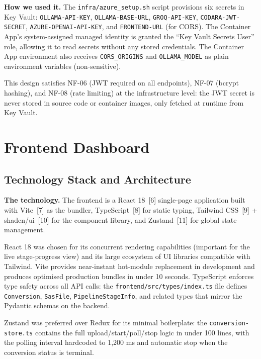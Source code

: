 \textbf{How we used it.} The \texttt{infra/azure\_setup.sh} script provisions
six secrets in Key Vault:
\texttt{OLLAMA-API-KEY}, \texttt{OLLAMA-BASE-URL},
\texttt{GROQ-API-KEY}, \texttt{CODARA-JWT-SECRET},
\texttt{AZURE-OPENAI-API-KEY}, and \texttt{FRONTEND-URL} (for CORS).
The Container App's system-assigned managed identity is granted the
``Key Vault Secrets User'' role, allowing it to read secrets without any stored
credentials. The Container App environment also receives \texttt{CORS\_ORIGINS}
and \texttt{OLLAMA\_MODEL} as plain environment variables (non-sensitive).

This design satisfies NF-06 (JWT required on all endpoints), NF-07 (bcrypt
hashing), and NF-08 (rate limiting) at the infrastructure level: the JWT secret
is never stored in source code or container images, only fetched at runtime from
Key Vault.

\section{Frontend Dashboard}
\label{sec:frontend-deployment}

\subsection{Technology Stack and Architecture}
\label{subsec:frontend-stack}

\textbf{The technology.} The frontend is a React 18~[6] single-page application
built with Vite~[7] as the bundler, TypeScript~[8] for static typing, Tailwind
CSS~[9] + shadcn/ui~[10] for the component library, and Zustand~[11] for
global state management.

React 18 was chosen for its concurrent rendering capabilities (important for
the live stage-progress view) and its large ecosystem of UI libraries compatible
with Tailwind. Vite provides near-instant hot-module replacement in development
and produces optimised production bundles in under 10 seconds. TypeScript
enforces type safety across all API calls: the
\texttt{frontend/src/types/index.ts} file defines \texttt{Conversion},
\texttt{SasFile}, \texttt{PipelineStageInfo}, and related types that mirror
the Pydantic schemas on the backend.

Zustand was preferred over Redux for its minimal boilerplate: the
\texttt{conversion-store.ts} contains the full upload/start/poll/stop logic
in under 100 lines, with the polling interval hardcoded to 1,200 ms and
automatic stop when the conversion status is terminal.

